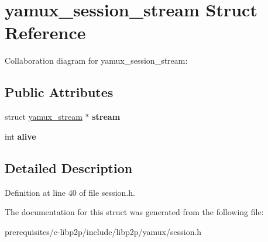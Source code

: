 \hypertarget{structyamux__session__stream}{}\section{yamux\+\_\+session\+\_\+stream Struct Reference}
\label{structyamux__session__stream}


Collaboration diagram for yamux\+\_\+session\+\_\+stream\+:
\subsection*{Public Attributes}
\begin{DoxyCompactItemize}
\item 
\mbox{\label{structyamux__session__stream_ae1529a5cd5fec4377f6e7dcc4306e5d3}} 
struct \mbox{\hyperlink{structyamux__stream}{yamux\+\_\+stream}} $\ast$ {\bfseries stream}
\item 
\mbox{\label{structyamux__session__stream_afd118b33446229f506029722ae072d37}} 
int {\bfseries alive}
\end{DoxyCompactItemize}


\subsection{Detailed Description}


Definition at line 40 of file session.\+h.



The documentation for this struct was generated from the following file\+:\begin{DoxyCompactItemize}
\item 
prerequisites/c-\/libp2p/include/libp2p/yamux/session.\+h\end{DoxyCompactItemize}
